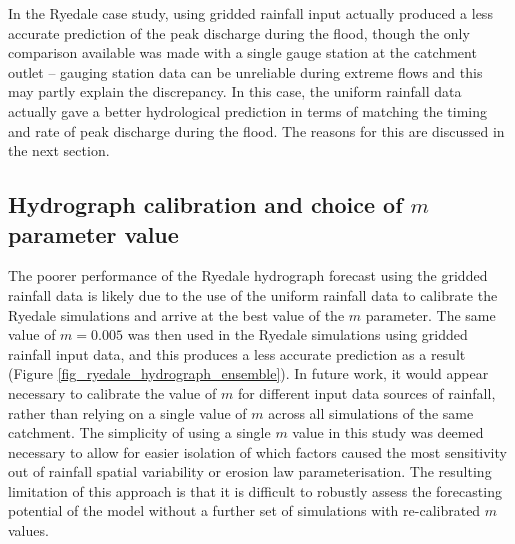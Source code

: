In the Ryedale case study, using gridded rainfall input actually produced a less accurate prediction of the peak discharge during the flood, though the only comparison available was made with a single gauge station at the catchment outlet -- gauging station data can be unreliable during extreme flows and this may partly explain the discrepancy. In this case, the uniform rainfall data actually gave a better hydrological prediction in terms of matching the timing and rate of peak discharge during the flood. The reasons for this are discussed in the next section.

\subsection{Hydrograph calibration and choice of \(m\) parameter value}
The poorer performance of the Ryedale hydrograph forecast using the gridded rainfall data is likely due to the use of the uniform rainfall data to calibrate the Ryedale simulations and arrive at the best value of the \(m\) parameter. The same value of \(m = 0.005\) was then used in the Ryedale simulations using gridded rainfall input data, and this produces a less accurate prediction as a result (Figure \ref{fig_ryedale_hydrograph_ensemble}). In future work, it would appear necessary to calibrate the value of \(m\) for different input data sources of rainfall, rather than relying on a single value of \(m\) across all simulations of the same catchment. The simplicity of using a single \(m\) value in this study was deemed necessary to allow for easier isolation of which factors caused the most sensitivity out of rainfall spatial variability or erosion law parameterisation. The resulting limitation of this approach is that it is difficult to robustly assess the forecasting potential of the model without a further set of simulations with re-calibrated \(m\) values.

